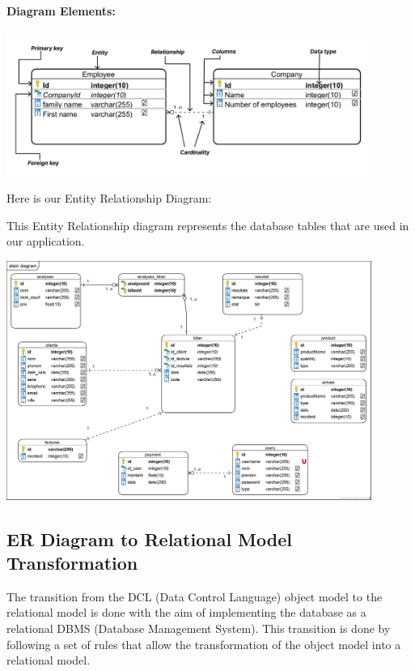 \documentclass{article}
\begin{document}
\paragraph*{\textbf{Diagram Elements:}}
\vspace{0.3cm}
\begin{center}
    \includegraphics[width=451px]{media/entity_relationship_elements.png}
\end{center}
\vspace{1.5cm}
\noindent Here is our Entity Relationship Diagram:

\newpage
This Entity Relationship diagram represents the database tables that are used in our application.

\begin{center}
    \includegraphics[width=451px]{media/entity relation diagram/database diagram.png}
\end{center}

\newpage
\subsection[Relational Model]{ER Diagram to Relational Model Transformation}
The transition from the DCL (Data Control Language) object model to the relational model is done with the aim of implementing the database as a relational DBMS (Database Management System). This transition is done by following a set of rules that allow the transformation of the object model into a relational model.
\end{document}
